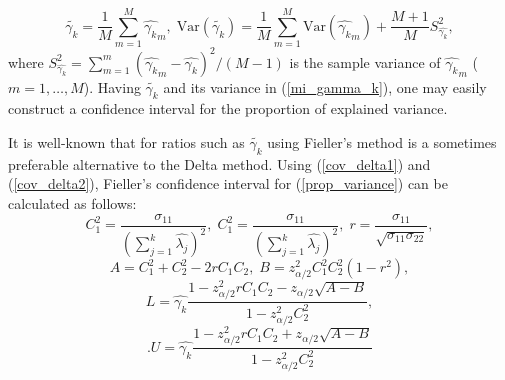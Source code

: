 \documentclass[11pt,a5paper,twoside]{book}
\begin{document}
\begin{equation}
\label{mi_gamma_k}
\widetilde{\gamma_k}= \frac{1}{M} \sum_{m=1}^M \widehat{\gamma_k}_m,\;
\mathrm{Var}(\widetilde{\gamma_k})= \frac{1}{M} \sum_{m=1}^M \mathrm{Var}(\widehat{\gamma_k}_m) + \frac{M+1}{M} S_{\widehat{\gamma_k}}^2,
\end{equation}
where $S_{\widehat{\gamma_k}}^2= \sum_{m=1}^m (\widehat{\gamma_k}_m - \widehat{\gamma_k})^2/(M-1)$ is the sample variance of $\widehat{\gamma_k}_m$ ($m=1,\ldots,M$).
Having $\widetilde{\gamma_k}$ and its variance in (\ref{mi_gamma_k}), one may easily construct a confidence interval for the proportion of explained variance. 

It is well-known that for ratios such as $\widetilde{\gamma_k}$ using Fieller's method \citep{fieller1954} is a sometimes preferable alternative to the Delta method. Using (\ref{cov_delta1}) and (\ref{cov_delta2}), Fieller's confidence interval for (\ref{prop_variance}) can be calculated as follows:
\begin{equation*}
C_1^2 =\frac{\sigma_{11}}{\left(\sum_{j=1}^k \widehat{\lambda_j}\right)^2},\;C_1^2 =\frac{\sigma_{11}}{\left(\sum_{j=1}^k \widehat{\lambda_j}\right)^2},\;r=  \frac{\sigma_{11}}{\sqrt{\sigma_{11} \sigma_{22}}},
\end{equation*}
\begin{equation*}
A= C_1^2 + C_2^2 - 2r C_1C_2,\;B= z_{\alpha/2}^2 C_1^2 C_2^2 (1-r^2),
\end{equation*}
\begin{equation}
\label{fieller_l}
L= \widehat{\gamma_k} \frac{1-z_{\alpha/2}^2 r C_1C_2 - z_{\alpha/2}\sqrt{A-B}}{1-z_{\alpha/2}^2C_2^2}, 
\end{equation}
\begin{equation}
\label{fieller_u}.
U= \widehat{\gamma_k} \frac{1-z_{\alpha/2}^2 r C_1C_2 + z_{\alpha/2}\sqrt{A-B}}{1-z_{\alpha/2}^2C_2^2} 
\end{equation}
\end{document}
